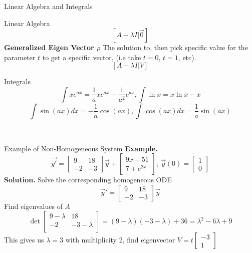 \documentclass{article}
\begin{document}
\begin{multicols*}{3}
\begin{blackbox}{Linear Algebra and Integrals}
\begin{pinkbox}{Linear Algebra}
            \[[A - \lambda I | \vec{0}]\]
            \textbf{Generalized Eigen Vector $\rho$} The solution to, then pick specific value for the parameter $t$ to get a specific vector, (i.e take $t=0$, $t=1$, etc).\\[-2ex]
            \[[A - \lambda I | V]\]
        \end{pinkbox}
        \begin{brownbox}{Integrals}
            \[\int xe^{ax} = \frac{1}{a}xe^{ax} - \frac{1}{a^2}e^{ax}, \int \ln x = x\ln x - x \]
            \[\int \sin(ax)dx = -\frac{1}{a}\cos(ax), \int \cos(ax)dx = \frac{1}{a}\sin (ax)\]
        \end{brownbox}\\[-2ex]
    \end{blackbox}
    \begin{blackbox}{Example of Non-Homogeneous System}
        {\footnotesize
            \textbf{Example.}\\[-2ex] 
            \[\vec{y'} = \begin{bmatrix}
                9 & 18\\
                -2 & -3
            \end{bmatrix}\vec{y} + \begin{bmatrix}
                9x - 51\\
                7 + e^{2x}
            \end{bmatrix}; \ \vec{y}(0) = \begin{bmatrix}
                1\\
                0
            \end{bmatrix}\]
            \textbf{Solution.} Solve the corresponding homogeneous ODE
            \[\vec{y}' = \begin{bmatrix}
                9 & 18\\
                -2 & -3
            \end{bmatrix}\vec{y}\]
            Find eigenvalues of $A$
            \[\det\begin{bmatrix}
                9 - \lambda & 18\\
                -2 & -3 - \lambda\\
            \end{bmatrix} = (9 - \lambda)(-3-\lambda) + 36 = \lambda^2 -6\lambda + 9\]
            This gives us $\lambda = 3$ with multiplicity 2, find eigenvector $V = t\begin{bmatrix}-3\\1\end{bmatrix}$
}
\end{blackbox}
\end{multicols*}
\end{document}
